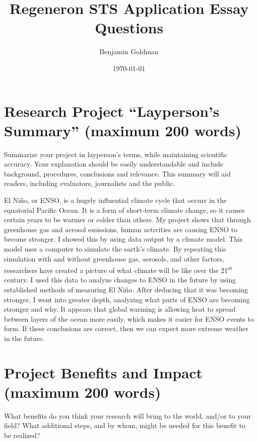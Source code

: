 \documentclass[little]{basic}
\author{Benjamin Goldman}
\date{\today}
\title{Regeneron STS Application Essay Questions}
\begin{document}
\maketitle

\section{Research Project “Layperson’s Summary” (maximum 200 words)}
\label{sec:org3c116f0}
Summarize your project in layperson’s terms, while maintaining scientific accuracy. Your explanation should be easily understandable and include background, procedures, conclusions and relevance. This summary will aid readers, including evaluators, journalists and the public.

El Niño, or ENSO, is a hugely influential climate cycle that occurs in the equatorial Pacific Ocean. It is a form of short-term climate change, so it causes certain years to be warmer or colder than others. My project shows that through greenhouse gas and aerosol emissions, human activities are causing ENSO to become stronger. I showed this by using data output by a climate model. This model uses a computer to simulate the earth's climate. By repeating this simulation with and without greenhouse gas, aerosols, and other factors, researchers have created a picture of what climate will be like over the 21\textsuperscript{st} century. I used this data to analyze changes to ENSO in the future by using established methods of measuring El Niño. After deducing that it was becoming stronger, I went into greater depth, analyzing what parts of ENSO are becoming stronger and why. It appears that global warming is allowing heat to spread between layers of the ocean more easily, which makes it easier for ENSO events to form. If these conclusions are correct, then we can expect more extreme weather in the future.

\section{Project Benefits and Impact (maximum 200 words)}
\label{sec:org3884d1d}
What benefits do you think your research will bring to the world, and/or to your field? What additional steps, and by whom, might be needed for this benefit to be realized?
\end{document}

